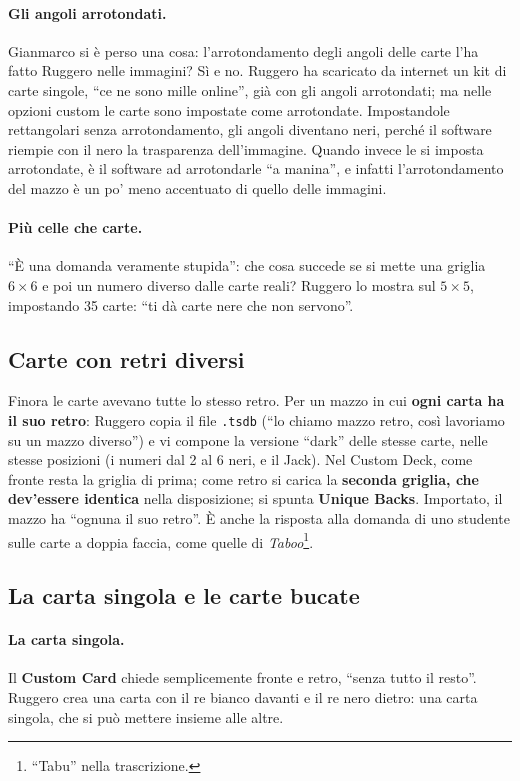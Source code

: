 \paragraph{Gli angoli arrotondati.} Gianmarco si è perso una cosa: l'arrotondamento
degli angoli delle carte l'ha fatto Ruggero nelle immagini? Sì e no. Ruggero ha
scaricato da internet un kit di carte singole, ``ce ne sono mille online'', già con gli
angoli arrotondati; ma nelle opzioni custom le carte sono impostate come arrotondate.
Impostandole rettangolari senza arrotondamento, gli angoli diventano neri, perché il
software riempie con il nero la trasparenza dell'immagine. Quando invece le si imposta
arrotondate, è il software ad arrotondarle ``a manina'', e infatti l'arrotondamento
del mazzo è un po' meno accentuato di quello delle immagini.

\paragraph{Più celle che carte.} ``È una domanda veramente stupida'': che cosa succede
se si mette una griglia $6\times6$ e poi un numero diverso dalle carte reali? Ruggero
lo mostra sul $5\times5$, impostando 35 carte: ``ti dà carte nere che non servono''.

\subsection{Carte con retri diversi}
\label{a8:sec:retri}

Finora le carte avevano tutte lo stesso retro. Per un mazzo in cui \textbf{ogni carta
ha il suo retro}: Ruggero copia il file \texttt{.tsdb} (``lo chiamo mazzo retro, così
lavoriamo su un mazzo diverso'') e vi compone la versione ``dark'' delle stesse carte,
nelle stesse posizioni (i numeri dal 2 al 6 neri, e il Jack). Nel Custom Deck, come
fronte resta la griglia di prima; come retro si carica la \textbf{seconda griglia, che
dev'essere identica} nella disposizione; si spunta \textbf{Unique Backs}. Importato, il
mazzo ha ``ognuna il suo retro''. È anche la risposta alla domanda di uno studente sulle
carte a doppia faccia, come quelle di \emph{Taboo}\footnote{``Tabu'' nella
trascrizione.}.

\subsection{La carta singola e le carte bucate}
\label{a8:sec:bucate}

\paragraph{La carta singola.} Il \textbf{Custom Card} chiede semplicemente fronte e
retro, ``senza tutto il resto''. Ruggero crea una carta con il re bianco davanti e il re
nero dietro: una carta singola, che si può mettere insieme alle altre.

